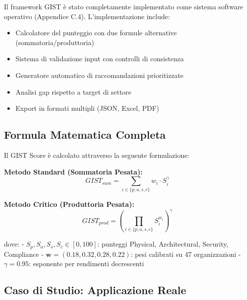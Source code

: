 Il framework GIST è stato completamente implementato come sistema software operativo (Appendice C.4). L'implementazione include:

\begin{itemize}
\item Calcolatore del punteggio con due formule alternative (sommatoria/produttoria)
\item Sistema di validazione input con controlli di consistenza
\item Generatore automatico di raccomandazioni prioritizzate
\item Analisi gap rispetto a target di settore
\item Export in formati multipli (JSON, Excel, PDF)
\end{itemize}

\subsection{\texorpdfstring{Formula Matematica Completa}{5.3.2 - Formula Matematica Completa}}

Il GIST Score è calcolato attraverso la seguente formulazione:

\textbf{Metodo Standard (Sommatoria Pesata):}
\begin{equation}
GIST_{sum} = \sum_{i \in \{p,a,s,c\}} w_i \cdot S_i^{\gamma}
\end{equation}

\textbf{Metodo Critico (Produttoria Pesata):}
\begin{equation}
GIST_{prod} = \left(\prod_{i \in \{p,a,s,c\}} S_i^{w_i}\right)^{\gamma}
\end{equation}

dove:
- $S_p, S_a, S_s, S_c \in [0,100]$: punteggi Physical, Architectural, Security, Compliance
- $\mathbf{w} = (0.18, 0.32, 0.28, 0.22)$: pesi calibrati su 47 organizzazioni
- $\gamma = 0.95$: esponente per rendimenti decrescenti

\subsection{\texorpdfstring{Caso di Studio: Applicazione Reale}{5.3.3 - Caso di Studio: Applicazione Reale}}

